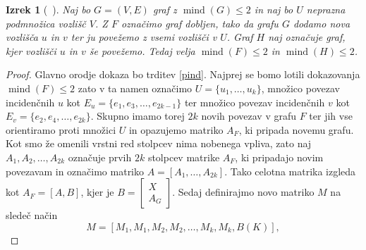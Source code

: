 \documentclass[12pt,a4paper,twoside]{article}
\theoremstyle{definition} %
\theoremstyle{plain} %
\newtheorem{izrek}[definicija]{Izrek}
\numberwithin{equation}{section}  %
\DeclareMathOperator{\mind}{mind}
\begin{document}
\begin{izrek}[~\citet{alg_org}]
\label{algcons}
Naj bo $G = (V, E)$ graf z $\mind(G) \le 2$ in naj bo $U$ neprazna podmnožica vozlišč $V$. Z $F$ označimo graf dobljen, tako da grafu $G$ dodamo nova vozlišča $u$ in $v$ ter ju povežemo z vsemi vozlišči v $U$. Graf $H$ naj označuje graf, kjer vozlišči $u$ in $v$ še povežemo. Tedaj velja $\mind(F) \le 2$ in $\mind(H) \le 2$.
\end{izrek}

 \begin{proof}
Glavno orodje dokaza bo trditev \ref{pind}. Najprej se bomo lotili dokazovanja $\mind(F) \le 2$ zato v ta namen označimo $U = \{u_1, \ldots, u_k\}$, množico povezav incidenčnih $u$ kot $E_u = \{e_1, e_3, \ldots, e_{2k - 1}\}$ ter množico povezav incidenčnih $v$ kot $E_v = \{e_2, e_4, \ldots,e_{2k}\}$. Skupno imamo torej $2k$ novih povezav v grafu $F$ ter jih vse orientiramo proti množici $U$ in opazujemo matriko $A_F$, ki pripada novemu grafu. Kot smo že omenili vrstni red stolpcev nima nobenega vpliva, zato naj $A_1, A_2, \ldots, A_{2k}$ označuje prvih $2k$ stolpcev matrike $A_F$, ki pripadajo novim povezavam in označimo matriko $A = [A_1, \ldots, A_{2k}]$. Tako celotna matrika izgleda kot $A_F =[A, B] $, kjer je $ B =\begin{bmatrix}X \\A_G \end{bmatrix}  $. Sedaj definirajmo novo matriko $M$ na sledeč način
$$ M = [M_1, M_1, M_2, M_2, \ldots, M_k, M_k, B(K)], $$

\end{proof}
\end{document}
